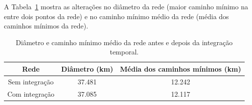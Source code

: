 



 



A Tabela~\ref{tab:centralidade-proximidade-rede-estatica-integracao-temporal} mostra as alterações no diâmetro da rede (maior caminho mínimo na entre dois pontos da rede) e no caminho mínimo médio da rede (média dos caminhos mínimos da rede).

\begin{table}[htb]
    \caption{Diâmetro e caminho mínimo médio da rede antes e depois da integração temporal.}
    \label{tab:centralidade-proximidade-rede-estatica-integracao-temporal}
    \centering
    \footnotesize
    \begin{tabular}{ccc} 
        \hline
        Rede & Diâmetro (km) & Média dos caminhos mínimos (km)\\
        \hline
           Sem integração &  37.481 &  12.242 \\
           Com integração &  37.085 &  12.117 \\
        \hline  
    \end{tabular}
\end{table}


